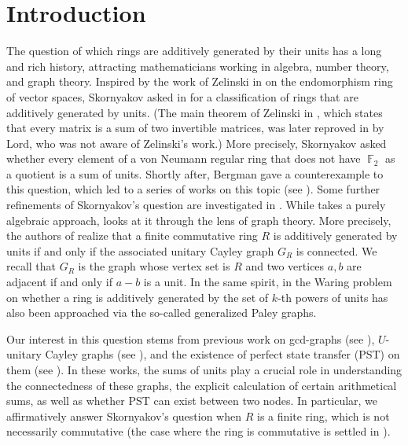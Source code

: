 \documentclass[11pt, a4paper]{amsart}
\theoremstyle{definition}
\DeclareMathOperator{\F}{\mathbb{F}}
\numberwithin{equation}{section}
\begin{document}
\section{Introduction}
The question of which rings are additively generated by their units has a long and rich history, attracting mathematicians working in algebra, number theory, and graph theory. Inspired by the work of Zelinski in \cite{zelinsky1954every} on the endomorphism ring of vector spaces, Skornyakov asked in \cite[p.167, Problem 31]{Skornyakov1964} for a classification of rings that are additively generated by units. (The main theorem of Zelinski in \cite{zelinsky1954every}, which states that every matrix is a sum of two invertible matrices, was later reproved in \cite{invertible_matrices} by Lord, who was not aware of Zelinski's work.) More precisely, Skornyakov asked whether every element of a von Neumann regular ring that does not have $\F_2$ as a quotient is a sum of units. Shortly after, Bergman gave a counterexample to this question, which led to a series of works on this topic (see \cite{Ehrlich1968, Raphael1974}). Some further refinements of Skornyakov's question are investigated in \cite{goldsmith1998unit, maimani2010rings}. While \cite{goldsmith1998unit} takes a purely algebraic approach, \cite{maimani2010rings} looks at it through the lens of graph theory. More precisely, the authors of \cite{maimani2010rings} realize that a finite commutative ring $R$ is additively generated by units if and only if the associated unitary Cayley graph $G_{R}$ is connected. We recall that $G_{R}$ is the graph whose vertex set is $R$ and two vertices $a,b$ are adjacent if and only if $a-b$ is a unit. In the same spirit, in \cite{podesta2021_finitefield, podesta2025GP, podesta_new} the Waring problem on whether a ring is additively generated by the set of $k$-th powers of units has also been approached via the so-called generalized Paley graphs.







Our interest in this question stems from previous work on gcd-graphs (see \cite{klotz2007some, nguyen2024certain, nguyengcd2026}), $U$-unitary Cayley graphs (see \cite{nguyen2025supercharacters}), and the existence of perfect state transfer (PST) on them (see \cite{bavsic2009perfect, nguyen2025perfect, pst-gcd-new}). In these works, the sums of units play a crucial role in understanding the connectedness of these graphs, the explicit calculation of certain arithmetical sums, as well as whether PST can exist between two nodes. In particular, we affirmatively answer Skornyakov's question when $R$ is a finite ring, which is not necessarily commutative (the case where the ring is commutative is settled in \cite{maimani2010rings}).
\end{document}
